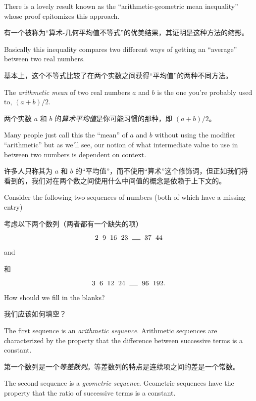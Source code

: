 There is a lovely result known as the 
``arithmetic-geometric mean inequality''
whose proof epitomizes this approach.

有一个被称为“算术-几何平均值不等式”的优美结果，其证明是这种方法的缩影。

Basically this inequality compares two
different ways of getting an ``average'' between two real numbers.

基本上，这个不等式比较了在两个实数之间获得“平均值”的两种不同方法。

The 
\emph{arithmetic mean} of two real numbers $a$ and $b$ is the one you're 
probably used to, $(a+b)/2$.

两个实数 $a$ 和 $b$ 的\emph{算术平均值}是你可能习惯的那种，即 $(a+b)/2$。

Many people just call this the ``mean''
of $a$ and $b$ without using the modifier ``arithmetic'' but as we'll
see, our notion of what intermediate value to use in between two numbers
is dependent on context.

许多人只称其为 $a$ 和 $b$ 的“平均值”，而不使用“算术”这个修饰词，但正如我们将看到的，我们对在两个数之间使用什么中间值的概念是依赖于上下文的。

Consider the following two sequences of numbers
(both of which have a missing entry) 

考虑以下两个数列（两者都有一个缺失的项）

\[ 2 \rule{6pt}{0pt} 9  \rule{6pt}{0pt} 16  \rule{6pt}{0pt} 23  \rule{6pt}{0pt} \rule{12pt}{.5pt}  \rule{6pt}{0pt} 37  \rule{6pt}{0pt} 44 \]

\noindent and

\noindent 和

\[ 3 \rule{6pt}{0pt} 6  \rule{6pt}{0pt} 12  \rule{6pt}{0pt} 24  \rule{6pt}{0pt} \rule{12pt}{.5pt}  \rule{6pt}{0pt} 96  \rule{6pt}{0pt} 192. \]

\noindent How should we fill in the blanks?

\noindent 我们应该如何填空？

The first sequence is an 
\emph{arithmetic sequence}.  
Arithmetic sequences 
are characterized by the property that the difference between successive
terms is a constant.

第一个数列是一个\emph{等差数列}。等差数列的特点是连续项之间的差是一个常数。

The second sequence is a 
\emph{geometric sequence}. 
Geometric sequences have the property that the ratio of successive terms 
is a constant.

